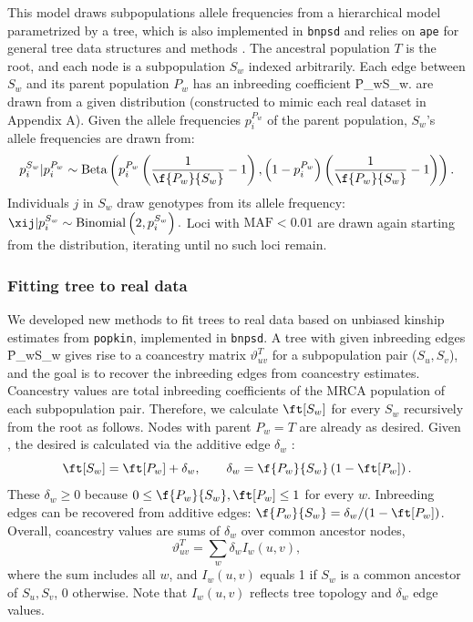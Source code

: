 \documentclass[11pt]{article}
\begin{document}
This model draws subpopulations allele frequencies from a hierarchical model parametrized by a tree, which is also implemented in \texttt{bnpsd} and relies on \texttt{ape} for general tree data structures and methods \citep{paradis_ape_2019}.
The ancestral population $T$ is the root, and each node is a subpopulation $S_w$ indexed arbitrarily.
Each edge between $S_w$ and its parent population $P_w$ has an inbreeding coefficient \f{P_w}{S_w}.
\pit are drawn from a given distribution (constructed to mimic each real dataset in Appendix A).
Given the allele frequencies $p_i^{P_w}$ of the parent population, $S_w$'s allele frequencies are drawn from:
$$
p_i^{S_w} | p_i^{P_w}
\sim
\text{Beta} \left(
  p_i^{P_w} \left( \frac{1}{ \f{P_w}{S_w} } - 1 \right),
  \left( 1 - p_i^{P_w} \right) \left( \frac{1}{ \f{P_w}{S_w} } - 1 \right)
\right)
.
$$
Individuals $j$ in $S_w$ draw genotypes from its allele frequency:
$
\xij | p_i^{S_w}
\sim
\text{Binomial}\left( 2, p_i^{S_w} \right)
.
$
Loci with $\text{MAF} < 0.01$ are drawn again starting from the \pit distribution, iterating until no such loci remain.

\subsubsection{Fitting tree to real data}

We developed new methods to fit trees to real data based on unbiased kinship estimates from \texttt{popkin}, implemented in \texttt{bnpsd}.
A tree with given inbreeding edges \f{P_w}{S_w} gives rise to a coancestry matrix $\vartheta_{uv}^T$ for a subpopulation pair ($S_u,S_v$), and the goal is to recover the inbreeding edges from coancestry estimates.
Coancestry values are total inbreeding coefficients of the MRCA population of each subpopulation pair.
Therefore, we calculate $\ft[S_w]$ for every $S_w$ recursively from the root as follows.
Nodes with parent $P_w = T$ are already as desired.
Given \ft[P_w], the desired \ft[S_w] is calculated via the additive edge $\delta_w$ \citep{ochoa_estimating_2021}:
\begin{equation}
  \label{eq:inbr_total_additive}
  \ft[S_w] = \ft[P_w] + \delta_w,
  \quad\quad
  \delta_w = \f{P_w}{S_w} \left( 1 - \ft[P_w] \right).
\end{equation}
These $\delta_w \ge 0$ because $0 \le \f{P_w}{S_w}, \ft[P_w] \le 1$ for every $w$.
Inbreeding edges can be recovered from additive edges:
$\f{P_w}{S_w} = \delta_w /( 1 - \ft[P_w] )$.
Overall, coancestry values are sums of $\delta_w$ over common ancestor nodes,
\begin{equation}
  \label{eq:coanc_tree_additive}
  \vartheta_{uv}^T
  =
  \sum_w \delta_w I_w(u,v)
  ,
\end{equation}
where the sum includes all $w$, and $I_w(u,v)$ equals 1 if $S_w$ is a common ancestor of $S_u,S_v$, 0 otherwise.
Note that $I_w(u,v)$ reflects tree topology and $\delta_w$ edge values.
\end{document}
